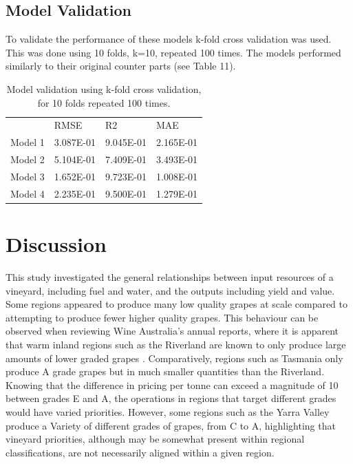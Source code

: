 \documentclass[review,12pt,authoryear]{elsarticle}
\begin{document}
\begin{linenumbers}

\subsection{Model Validation}
To validate the performance of these models k-fold cross validation was used. This was done using 10 folds, k=10, repeated 100 times. The models performed similarly to their original counter parts (see Table 11).


\begin{table}[]
  \label{tab:tab12}
  \caption{Model validation using k-fold cross validation, for 10 folds repeated 100 times.}
  \begin{tabular}{llll}
          & RMSE      & R2        & MAE       \\
  Model 1 & 3.087E-01 & 9.045E-01 & 2.165E-01 \\
  Model 2 & 5.104E-01 & 7.409E-01 & 3.493E-01 \\
  Model 3 & 1.652E-01 & 9.723E-01 & 1.008E-01 \\
  Model 4 & 2.235E-01 & 9.500E-01 & 1.279E-01
  \end{tabular}
  \end{table}

\section{Discussion}
This study investigated the general relationships between input resources of a vineyard, including fuel and water, and the outputs including yield and value. Some regions appeared to produce many low quality grapes at scale compared to attempting to produce fewer higher quality grapes. This behaviour can be observed when reviewing Wine Australia’s annual reports, where it is apparent that warm inland regions such as the Riverland are known to only produce large amounts of lower graded grapes \cite{wineaustraliaNationalVintageReport2022,winemakersfederationofaustraliaNationalVintageReport2017}. Comparatively, regions such as Tasmania only produce A grade grapes but in much smaller quantities than the Riverland. Knowing that the difference in pricing per tonne can exceed a magnitude of 10 between grades E and A, the operations in regions that target different grades would have varied priorities. However, some regions such as the Yarra Valley produce a Variety of different grades of grapes, from C to A, highlighting that vineyard priorities, although may be somewhat present within regional classifications, are not necessarily aligned within a given region. 


\end{linenumbers}
\end{document}
